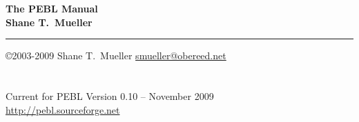 \documentclass[10pt,twoside,openright,titlepage,letter]{book}
\begin{document}
\begin{center}
\LARGE
\textbf{The PEBL Manual} \\
\vspace{0.7cm}\Large \textbf{Shane T.~Mueller}
\end{center}
\rule{\textwidth}{1mm}


\vspace{.4cm}

\normalsize
\noindent\copyright 2003-2009 Shane T.~Mueller \href{mailto:smueller@obereed.net}{smueller@obereed.net}\\
\\
\\


Current for PEBL Version 0.10 -- November 2009 \\
\href{http://pebl.sourceforge.net}{http://pebl.sourceforge.net}
\tableofcontents

\clearpage
{}
\renewcommand{\chaptermark}[1]{\markboth{\textbf{Chapter \thechapter}.\ \emph{#1}}{}}






\appendix
\end{document}
